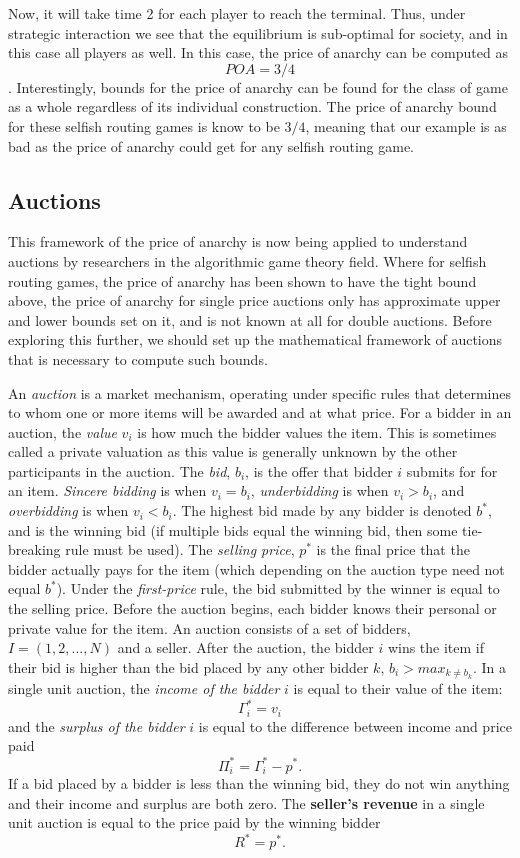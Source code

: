 \documentclass[12pt,twoside]{reedthesis}
\begin{document}
Now, it will take time 2 for each player to reach the terminal. Thus, under strategic interaction we see that the equilibrium is sub-optimal for society, and in this case all players as well. In this case, the price of anarchy can be computed as $$POA = 3/4$$. Interestingly, bounds for the price of anarchy can be found for the class of game as a whole regardless of its individual construction. The price of anarchy bound for these selfish routing games is know to be $3/4$, meaning that our example is as bad as the price of anarchy could get for any selfish routing game.

\subsection{Auctions}
This framework of the price of anarchy is now being applied to understand auctions by researchers in the algorithmic game theory field. Where for selfish routing games, the price of anarchy has been shown to have the tight bound above, the price of anarchy for single price auctions only has approximate upper and lower bounds set on it, and is not known at all for double auctions. Before exploring this further, we should set up the mathematical framework of auctions that is necessary to compute such bounds. 

An \textit{auction} is a market mechanism, operating under specific rules that determines to whom one or more items will be awarded and at what price. For a bidder in an auction, the \textit{value} $v_i$ is how much the bidder values the item. This is sometimes called a private valuation as this value is generally unknown by the other participants in the auction. The \textit{bid}, $b_i$, is the offer that bidder $i$ submits for for an item. \textit{Sincere bidding} is when $v_i = b_i$, \textit{underbidding} is when $v_i > b_i$, and \textit{overbidding} is when $v_i < b_i$. The highest bid made by any bidder is denoted $b^*$, and is the winning bid (if multiple bids equal the winning bid, then some tie-breaking rule must be used). The \textit{selling price}, $p^*$ is the final price that the bidder actually pays for the item (which depending on the auction type need not equal $b^*$). Under the \textit{first-price} rule, the bid submitted by the winner is equal to the selling price. Before the auction begins, each bidder knows their personal or private value for the item. An auction consists of a set of bidders, $I = (1,2, ...,N)$ and a seller. After the auction, the bidder $i$ wins the item if their bid is higher than the bid placed by any other bidder $k$, $b_i > max_{k \neq b_k}$. In a single unit auction, the \textit{income of the bidder} $i$ is equal to their value of the item: $$ \Gamma_i^* = v_i$$ and the \textit{surplus of the bidder} $i$ is equal to the difference between income and price paid $$ \Pi_i^* = \Gamma_i^* - p^*.$$ If a bid placed by a bidder is less than the winning bid, they do not win anything and their income and surplus are both zero. The \textbf{seller's revenue} in a single unit auction is equal to the price paid by the winning bidder $$ R^* = p^*.$$ 
\end{document}

